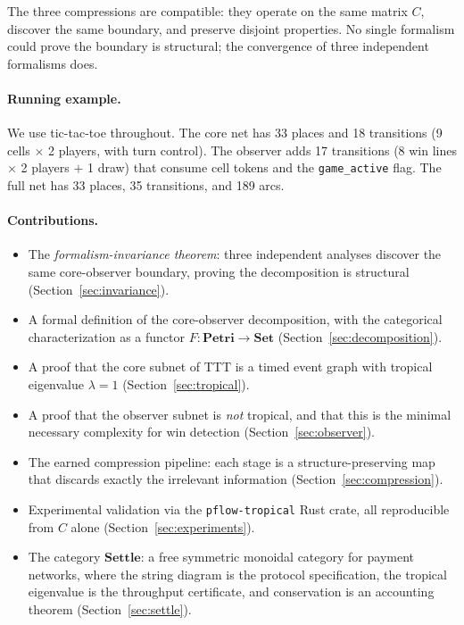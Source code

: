 \documentclass[11pt,a4paper]{article}
\newcommand{\Petri}{\mathbf{Petri}}
\newcommand{\Settle}{\mathbf{Settle}}
\begin{document}
The three compressions are compatible: they operate on the same matrix $C$, discover the same boundary, and preserve disjoint properties.
No single formalism could prove the boundary is structural; the convergence of three independent formalisms does.

\paragraph{Running example.}
We use tic-tac-toe throughout.
The core net has 33 places and 18 transitions (9 cells $\times$ 2 players, with turn control).
The observer adds 17 transitions (8 win lines $\times$ 2 players $+$ 1 draw) that consume cell tokens and the \texttt{game\_active} flag.
The full net has 33 places, 35 transitions, and 189 arcs.

\paragraph{Contributions.}
\begin{itemize}
  \item The \emph{formalism-invariance theorem}: three independent analyses discover the same core-observer boundary, proving the decomposition is structural (Section~\ref{sec:invariance}).
  \item A formal definition of the core-observer decomposition, with the categorical characterization as a functor $F : \Petri \to \mathbf{Set}$ (Section~\ref{sec:decomposition}).
  \item A proof that the core subnet of TTT is a timed event graph with tropical eigenvalue $\lambda = 1$ (Section~\ref{sec:tropical}).
  \item A proof that the observer subnet is \emph{not} tropical, and that this is the minimal necessary complexity for win detection (Section~\ref{sec:observer}).
  \item The earned compression pipeline: each stage is a structure-preserving map that discards exactly the irrelevant information (Section~\ref{sec:compression}).
  \item Experimental validation via the \texttt{pflow-tropical} Rust crate, all reproducible from $C$ alone (Section~\ref{sec:experiments}).
  \item The category $\Settle$: a free symmetric monoidal category for payment networks, where the string diagram is the protocol specification, the tropical eigenvalue is the throughput certificate, and conservation is an accounting theorem (Section~\ref{sec:settle}).
\end{itemize}
\end{document}
